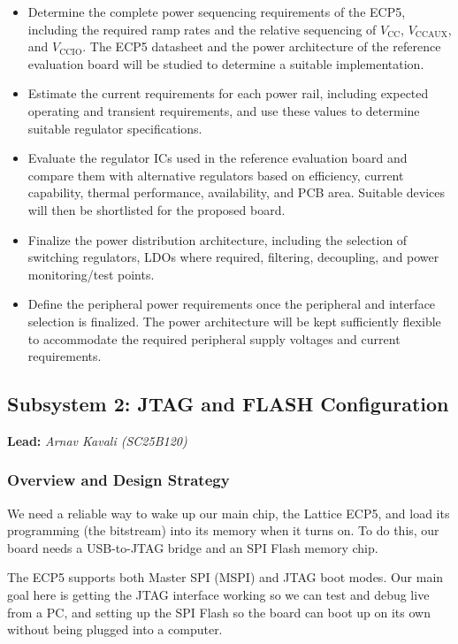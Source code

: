 \documentclass[12pt,a4paper]{article}
\begin{document}
\begin{itemize}[leftmargin=1cm]

    \item Determine the complete power sequencing requirements of the ECP5, including the required ramp rates and the relative sequencing of $V_{\text{CC}}$, $V_{\text{CCAUX}}$, and $V_{\text{CCIO}}$. The ECP5 datasheet and the power architecture of the reference evaluation board will be studied to determine a suitable implementation.

    \item Estimate the current requirements for each power rail, including expected operating and transient requirements, and use these values to determine suitable regulator specifications.

    \item Evaluate the regulator ICs used in the reference evaluation board and compare them with alternative regulators based on efficiency, current capability, thermal performance, availability, and PCB area. Suitable devices will then be shortlisted for the proposed board.

    \item Finalize the power distribution architecture, including the selection of switching regulators, LDOs where required, filtering, decoupling, and power monitoring/test points.

    \item Define the peripheral power requirements once the peripheral and interface selection is finalized. The power architecture will be kept sufficiently flexible to accommodate the required peripheral supply voltages and current requirements.

\end{itemize}

\subsection{Subsystem 2: JTAG and FLASH Configuration}
\noindent\textbf{Lead:} \textit{Arnav Kavali (SC25B120)}
\subsubsection{Overview and Design Strategy}
We need a reliable way to wake up our main chip, the Lattice ECP5, and load its programming (the bitstream) into its memory when it turns on. To do this, our board needs a USB-to-JTAG bridge and an SPI Flash memory chip.

The ECP5 supports both Master SPI (MSPI) and JTAG boot modes. Our main goal here is getting the JTAG interface working so we can test and debug live from a PC, and setting up the SPI Flash so the board can boot up on its own without being plugged into a computer.
\end{document}
